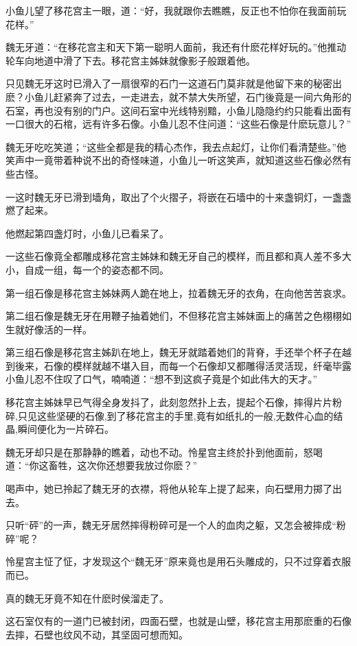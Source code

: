 \documentclass[12pt,oneside]{book}
\begin{document}
小鱼儿望了移花宫主一眼，道：``好，我就跟你去瞧瞧，反正也不怕你在我面前玩花样。''

魏无牙道：``在移花宫主和天下第一聪明人面前，我还有什麽花样好玩的。''他推动轮车向地道中滑了下去。移花宫主姊妹就像影子般跟着他。

只见魏无牙这时已滑入了一扇很窄的石门一这道石门莫非就是他留下来的秘密出麽？小鱼儿赶紧奔了过去，一走进去，就不禁大失所望，石门後竟是一间六角形的石室，再也没有别的门户。这间石室中光线特别黯，小鱼儿隐隐约约只能看出面有一口很大的石棺，远有许多石像。小鱼儿忍不住问道：``这些石像是什麽玩意儿？''

魏无牙吃吃笑道；``这些全都是我的精心杰作，我去点起灯，让你们看清楚些。''他笑声中一竟带着种说不出的奇怪味道，小鱼儿一听这笑声，就知道这些石像必然有些古怪。

一这时魏无牙已滑到墙角，取出了个火摺子，将嵌在石墙中的十来盏铜灯，一盏盏燃了起来。

他燃起第四盏灯时，小鱼儿已看呆了。

一这些石像竟全都雕成移花宫主姊妹和魏无牙自己的模样，而且都和真人差不多大小，自成一组，每一个的姿态都不同。

第一组石像是移花宫主姊妹两人跪在地上，拉着魏无牙的衣角，在向他苦苦哀求。

第二组石像是魏无牙在用鞭子抽着她们，不但移花宫主姊妹面上的痛苦之色栩栩如生就好像活的一样。

第三组石像是移花宫主姊趴在地上，魏无牙就踏着她们的背脊，手还举个杯子在越到後来，石像的模样就越不堪入目，而每一个石像却又都雕得活灵活现，纤毫毕露小鱼儿忍不住叹了口气，喃喃道：``想不到这疯子竟是个如此伟大的天才。''

移花宫主姊妹早已气得全身发抖了，此刻忽然扑上去，提起个石像，摔得片片粉碎,只见这些坚硬的石像,到了移花宫主的手里,竟有如纸扎的一般,无数件心血的结晶,瞬间便化为一片碎石。

魏无牙却只是在那静静的瞧着，动也不动。怜星宫主终於扑到他面前，怒喝道：``你这畜牲，这次你还想要我放过你麽？''

喝声中，她已拎起了魏无牙的衣襟，将他从轮车上提了起来，向石壁用力掷了出去。

只听``砰''的一声，魏无牙居然摔得粉碎可是一个人的血肉之躯，又怎会被摔成``粉碎''呢？

怜星宫主怔了怔，才发现这个``魏无牙''原来竟也是用石头雕成的，只不过穿着衣服而已。

真的魏无牙竟不知在什麽时侯溜走了。

这石室仅有的一道门已被封闭，四面石壁，也就是山壁，移花宫主用那麽重的石像去摔，石壁也纹风不动，其坚固可想而知。
\end{document}
